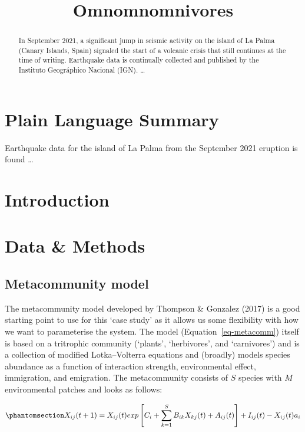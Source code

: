 \documentclass[
]{agujournal2019}
\begin{document}
\title{Omnomnomnivores}



\begin{abstract}
In September 2021, a significant jump in seismic activity on the island
of La Palma (Canary Islands, Spain) signaled the start of a volcanic
crisis that still continues at the time of writing. Earthquake data is
continually collected and published by the Instituto Geográphico
Nacional (IGN). \ldots{}
\end{abstract}

\section*{Plain Language Summary}
Earthquake data for the island of La Palma from the September 2021
eruption is found \ldots{}



\section{Introduction}\label{introduction}

\section{Data \& Methods}\label{sec-data-methods}

\subsection{Metacommunity model}\label{metacommunity-model}

The metacommunity model developed by Thompson \& Gonzalez (2017) is a
good starting point to use for this `case study' as it allows us some
flexibility with how we want to parameterise the system. The model
(Equation~\ref{eq-metacomm}) itself is based on a tritrophic community
(`plants', `herbivores', and `carnivores') and is a collection of
modified Lotka--Volterra equations and (broadly) models species
abundance as a function of interaction strength, environmental effect,
immigration, and emigration. The metacommunity consists of \(S\) species
with \(M\) environmental patches and looks as follows:

\begin{equation}\phantomsection\label{eq-metacomm}{
X_{ij}(t+1)=X_{ij}(t)exp\left[C_{i} + \sum_{k=1}^{S}B_{ik}X_{kj}(t)+A_{ij}(t)\right]+I_{ij}(t)-X_{ij}(t)a_{i}
}\end{equation}
\end{document}
